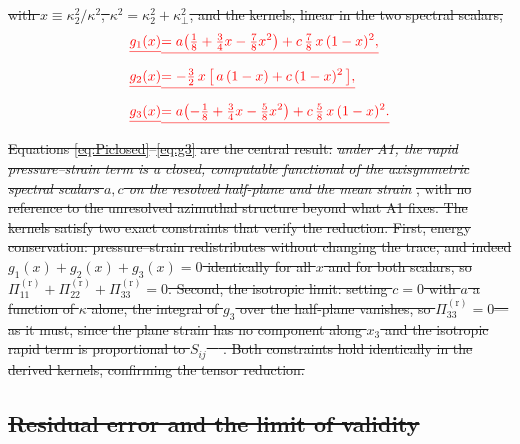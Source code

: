\documentclass[lineno]{JFM-FLM_Au}
\providecommand{\DIFdel}[1]{{\protect\color{red}\sout{#1}}}                      %
\begin{document}
\DIFdel{with $x\equiv\kappa_2^2/\kappa^2$, $\kappa^2=\kappa_2^2+\kappa_\perp^2$, and the
kernels, linear in the two spectral scalars,
}\begin{eqnarray*}
  \DIFdel{g_{1}(x) }&\DIFdel{= a\!\left(\tfrac18 + \tfrac34 x - \tfrac78 x^2\right)
            + c\,\tfrac78\,x\,(1-x)^2, \label{eq:g1}}\\[2pt]
  \DIFdel{g_{2}(x) }&\DIFdel{= -\tfrac32\,x\,\bigl[\,a\,(1-x) + c\,(1-x)^2\,\bigr],
            \label{eq:g2}}\\[2pt]
  \DIFdel{g_{3}(x) }&\DIFdel{= a\!\left(-\tfrac18 + \tfrac34 x - \tfrac58 x^2\right)
            + c\,\tfrac58\,x\,(1-x)^2. %
}\end{eqnarray*}%
\DIFdel{Equations \eqref{eq:Piclosed}--\eqref{eq:g3} are the central result:
}\emph{\DIFdel{under A1, the rapid pressure--strain term is a closed, computable
functional of the axisymmetric spectral scalars $a,c$ on the resolved
half-plane and the mean strain}}%
\DIFdel{, with no reference to the unresolved azimuthal
structure beyond what A1 fixes. The kernels satisfy two exact constraints that
verify the reduction. First, energy conservation: pressure--strain
redistributes without changing the trace, and indeed
$g_1(x)+g_2(x)+g_3(x)=0$ identically for all $x$ and for both scalars, so
$\Pi^{(\mathrm r)}_{11}+\Pi^{(\mathrm r)}_{22}+\Pi^{(\mathrm r)}_{33}=0$.
Second, the isotropic limit: setting $c=0$ with $a$ a function of $\kappa$
alone, the integral of $g_3$ over the half-plane vanishes, so
$\Pi^{(\mathrm r)}_{33}=0$---as it must, since the plane strain has no
component along $x_3$ and the isotropic rapid term is proportional to $S_{ij}$
\mbox{%
\citep{Crow1968}}\hskip0pt%
. Both constraints hold identically in the derived kernels,
confirming the tensor reduction.
}%

\subsection{\DIFdel{Residual error and the limit of validity}}%
\addtocounter{subsection}{-1}%
\end{document}
